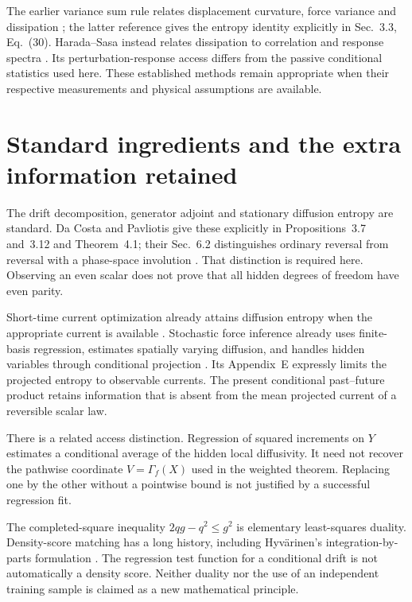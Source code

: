 The earlier variance sum rule relates displacement curvature, force variance
and dissipation \cite{ciVSR2024,ciVSRProofs2024}; the latter reference gives
the entropy identity explicitly in Sec.~3.3, Eq.~(30). Harada--Sasa instead
relates dissipation to correlation and response spectra
\cite{ogHaradaSasa2005}. Its perturbation-response access differs from the
passive conditional statistics used here. These established methods remain
appropriate when their respective measurements and physical assumptions
are available.

\section{Standard ingredients and the extra information retained}
The drift decomposition, generator adjoint and stationary diffusion entropy
are standard. Da Costa and Pavliotis give these explicitly in
Propositions~3.7 and~3.12 and Theorem~4.1; their Sec.~6.2 distinguishes
ordinary reversal from reversal with a phase-space involution
\cite{ogDaCosta2023}. That distinction is required here. Observing an even
scalar does not prove that all hidden degrees of freedom have even parity.

Short-time current optimization already attains diffusion entropy when the
appropriate current is available \cite{ogOtsubo2020}. Stochastic force
inference already uses finite-basis regression, estimates spatially varying
diffusion, and handles hidden variables through conditional projection
\cite{ogFrishman2020}. Its Appendix~E expressly limits the projected entropy
to observable currents. The present conditional past--future product retains
information that is absent from the mean projected current of a reversible
scalar law.

There is a related access distinction. Regression of squared increments on
$Y$ estimates a conditional average of the hidden local diffusivity.
It need not recover the pathwise coordinate $V=\Gamma_f(X)$ used in the
weighted theorem. Replacing one by the other without a pointwise bound is
not justified by a successful regression fit.

The completed-square inequality $2qg-q^2\le g^2$ is elementary
least-squares duality. Density-score matching has a long history, including
Hyv\"arinen's integration-by-parts formulation
\cite{ogHyvarinen2005}. The regression test function for a conditional drift
is not automatically a density score. Neither duality nor the use of an
independent training sample is claimed as a new mathematical principle.

